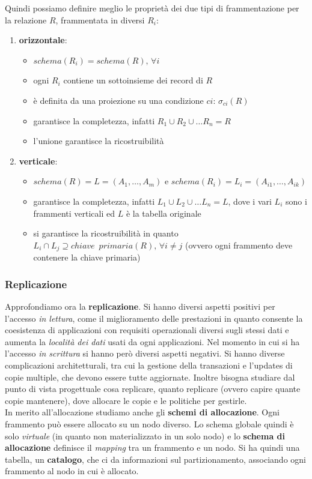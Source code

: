 \documentclass[a4paper,12pt, oneside]{book}
\begin{document}
Quindi possiamo definire meglio le proprietà dei due tipi di frammentazione per
la relazione $R$, frammentata in diversi $R_i$:
\begin{enumerate}
  \item \textbf{orizzontale}:
  \begin{itemize}
    \item $schema(R_i)=schema(R),\,\forall i$
    \item ogni $R_i$ contiene un sottoinsieme dei record di $R$
    \item è definita da una proiezione su una condizione $ci$: $\sigma_{ci}(R)$
    \item garantisce la completezza, infatti $R_1\cup R_2\cup\ldots R_n=R$
    \item l'unione garantisce la ricostruibilità
  \end{itemize}
  \item \textbf{verticale}:
  \begin{itemize}
    \item $schema(R)=L=(A_1,\ldots,A_m)$ e $schema(R_i) = L_i =
    (A_{i1},\ldots,A_{ik})$ 
    \item garantisce la completezza, infatti $L_1\cup L_2\cup\ldots L_n=L$, dove
    i vari $L_i$ sono i frammenti verticali ed $L$ è la tabella originale
    \item si garantisce la ricostruibilità in quanto $L_i\cap L_j \supseteq
    chiave\,\,\,primaria(R),\,\forall i\neq j$ (ovvero ogni frammento deve
    contenere la chiave primaria)
  \end{itemize}
\end{enumerate}
\subsubsection{Replicazione}
Approfondiamo ora la \textbf{replicazione}. Si hanno diversi aspetti positivi
per l'accesso \textit{in lettura},
come il miglioramento delle prestazioni in quanto consente la coesistenza di
applicazioni con requisiti operazionali diversi sugli stessi dati e aumenta la
\textit{località dei dati} usati da ogni applicazioni. Nel momento in cui si ha
l'accesso \textit{in scrittura} si hanno però diversi aspetti negativi. Si hanno
diverse complicazioni architetturali, tra cui la gestione della transazioni e
l'updates di copie multiple, che devono essere tutte aggiornate. Inoltre bisogna
studiare dal punto di vista progettuale cosa replicare, quanto replicare (ovvero
capire quante copie mantenere), dove allocare le copie e le politiche per
gestirle.\\
In merito all'allocazione studiamo anche gli \textbf{schemi di
  allocazione}. Ogni frammento può essere allocato su un nodo diverso. Lo schema
globale quindi è solo \textit{virtuale} (in quanto non materializzato in un
solo nodo) e lo \textbf{schema di allocazione} definisce il \textit{mapping} tra
un frammento e un nodo. Si ha quindi una tabella, un \textbf{catalogo}, che ci
da informazioni sul partizionamento, associando ogni frammento al nodo in cui è
allocato.
\end{document}
